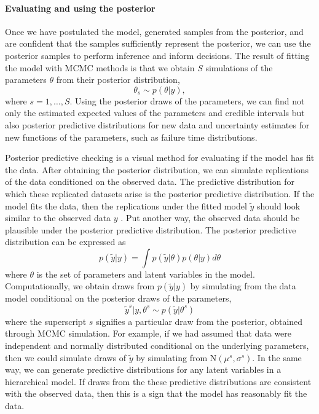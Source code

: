 \paragraph*{Evaluating and using the posterior}

Once we have postulated the model, generated samples from the posterior, and are confident that the samples sufficiently represent the posterior, we can use the posterior samples to perform inference and inform decisions. The result of fitting the model with MCMC methods is that we obtain $S$ simulations of the parameters $\theta$ from their posterior distribution,
\begin{equation}
  \theta_s \sim p(\theta|y),
\end{equation}
where $s = 1, \dots, S$. Using the posterior draws of the parameters, we can find not only the estimated expected values of the parameters and credible intervals but also posterior predictive distributions for new data and uncertainty estimates for new functions of the parameters, such as failure time distributions.

Posterior predictive checking \citep{BDA2020} is a visual method for evaluating if the model has fit the data. After obtaining the posterior distribution, we can simulate replications of the data conditioned on the observed data. The predictive distribution for which these replicated datasets arise is the posterior predictive distribution. If the model fits the data, then the replications under the fitted model $\tilde{y}$ should look similar to the observed data $y$ \citep[pp.~143]{BDA2020}. Put another way, the observed data should be plausible under the posterior predictive distribution. The posterior predictive distribution can be expressed as
\begin{equation}
 p(\tilde{y}|y) = \int p(\tilde{y}|\theta)p(\theta|y)d\theta
\end{equation}
where $\theta$ is the set of parameters and latent variables in the model. Computationally, we obtain draws from $p(\tilde{y}|y)$ by simulating from the data model conditional on the posterior draws of the parameters,
\begin{equation}
 \tilde{y}^s|y, \theta^s \sim p(\tilde{y}|\theta^s)
\end{equation}
where the superscript $s$ signifies a particular draw from the posterior, obtained through MCMC simulation. For example, if we had assumed that data were independent and normally distributed conditional on the underlying parameters, then we could simulate draws of $\tilde{y}$ by simulating from $\mbox{N}(\mu^s, \sigma^s)$. In the same way, we can generate predictive distributions for any latent variables in a hierarchical model. If draws from the these predictive distributions are consistent with the observed data, then this is a sign that the model has reasonably fit the data.

